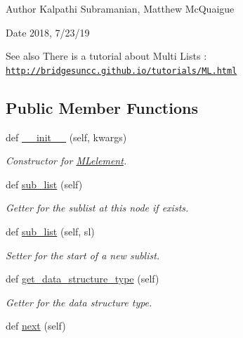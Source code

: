 \begin{DoxyAuthor}{Author}
Kalpathi Subramanian, Matthew Mc\+Quaigue
\end{DoxyAuthor}
\begin{DoxyDate}{Date}
2018, 7/23/19
\end{DoxyDate}
\begin{DoxySeeAlso}{See also}
There is a tutorial about Multi Lists \+: \href{http://bridgesuncc.github.io/tutorials/ML.html}{\tt http\+://bridgesuncc.\+github.\+io/tutorials/\+M\+L.\+html} 
\end{DoxySeeAlso}
\subsection*{Public Member Functions}
\begin{DoxyCompactItemize}
\item 
def \hyperlink{classbridges_1_1ml__element_1_1_m_lelement_ae0242b9e3f2d7d7ccc702ef0bc7a61ba}{\+\_\+\+\_\+init\+\_\+\+\_\+} (self, kwargs)
\begin{DoxyCompactList}\small\item\em Constructor for \hyperlink{classbridges_1_1ml__element_1_1_m_lelement}{M\+Lelement}. \end{DoxyCompactList}\item 
def \hyperlink{classbridges_1_1ml__element_1_1_m_lelement_a1b02783280dacd20982bb06a1e3070f4}{sub\+\_\+list} (self)
\begin{DoxyCompactList}\small\item\em Getter for the sublist at this node if exists. \end{DoxyCompactList}\item 
def \hyperlink{classbridges_1_1ml__element_1_1_m_lelement_a8ad12079b474fb676f49aed7bacd5e10}{sub\+\_\+list} (self, sl)
\begin{DoxyCompactList}\small\item\em Setter for the start of a new sublist. \end{DoxyCompactList}\item 
def \hyperlink{classbridges_1_1ml__element_1_1_m_lelement_a97693d616263a8ee59b066829e8ce7e8}{get\+\_\+data\+\_\+structure\+\_\+type} (self)
\begin{DoxyCompactList}\small\item\em Getter for the data structure type. \end{DoxyCompactList}\item 
def \hyperlink{classbridges_1_1ml__element_1_1_m_lelement_a951d30261514e6eaefdd7d60f1c77f73}{next} (self)

\end{DoxyCompactItemize}
